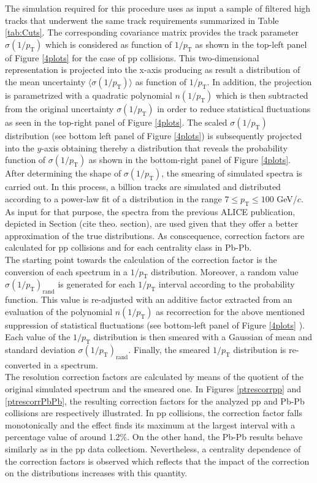 \documentclass[12pt,a4paper]{report}
\begin{document}
The simulation required for this procedure uses as input a sample of filtered high \pt tracks that underwent the same track requirements summarized in Table \ref{tab:Cuts}. The corresponding covariance matrix provides the track parameter $\sigma(1/p_\text{T})$ which is considered as function of $1/p_\text{T}$ as shown in the top-left panel of Figure \ref{4plots} for the case of pp collisions. This two-dimensional representation is projected into the x-axis producing as result a distribution of the mean uncertainty $\langle\sigma(1/p_\text{T})\rangle$ as function of $1/p_\text{T}$. In addition, the projection is parametrized with a quadratic polynomial $n(1/p_\text{T})$ which is then subtracted from the original uncertainty $\sigma(1/p_\text{T})$ in order to reduce statistical fluctuations as seen in the top-right panel of Figure \ref{4plots}. The scaled  $\sigma(1/p_\text{T})$ distribution (see bottom left panel of Figure \ref{4plots}) is subsequently projected into the $y$-axis obtaining thereby a distribution that reveals the probability function of $\sigma(1/p_\text{T})$ as shown in the bottom-right panel of Figure \ref{4plots}.\\
After determining the shape of $\sigma(1/p_\text{T})$, the smearing of simulated \pt spectra is carried out. In this process, a billion tracks are simulated and distributed according to a power-law fit of a \pt distribution in the range $7 \leq p_\text{T} \leq 100$ GeV/$c$. As input for that purpose, the \pt spectra from the previous ALICE publication, depicted in Section (cite theo. section), are used given that they offer a better approximation of the true \pt distributions. As conscequence, correction factors are calculated for pp collisions and for each centrality class in Pb-Pb.\\
The starting point towards the calculation of the correction factor is the conversion of each \pt spectrum in a $1/p_\text{T}$ distribution. Moreover, a random value $\sigma(1/p_\text{T})_\text{rand}$ is generated for each $1/p_\text{T}$ interval according to the probability function. This value is re-adjusted with an additive factor extracted from an evaluation of the polynomial $n(1/p_\text{T})$ as recorrection for the above mentioned suppression of statistical fluctuations (see bottom-left panel of Figure \ref{4plots} ). Each value of the $1/p_\text{T}$ distribution is then smeared with a Gaussian of mean \pt and standard deviation $\sigma(1/p_\text{T})_\text{rand}$. Finally, the smeared $1/p_\text{T}$ distribution is re-converted in a \pt spectrum.\\
The \pt resolution correction factors are calculated by means of the quotient of the original simulated \pt spectrum and the smeared one. In Figures \ref{ptrescorrpp} and \ref{ptrescorrPbPb}, the resulting correction factors for the analyzed pp and Pb-Pb collisions are respectively illustrated. In pp collisions, the correction factor falls monotonically and the effect finds its maximum at the largest \pt interval with a percentage value of around 1.2\%. On the other hand, the Pb-Pb results behave similarly as in the pp data collectiom. Nevertheless, a centrality dependence of the correction factors is observed which reflects that the impact of the correction on the \pt distributions increases with this quantity.
\end{document}
